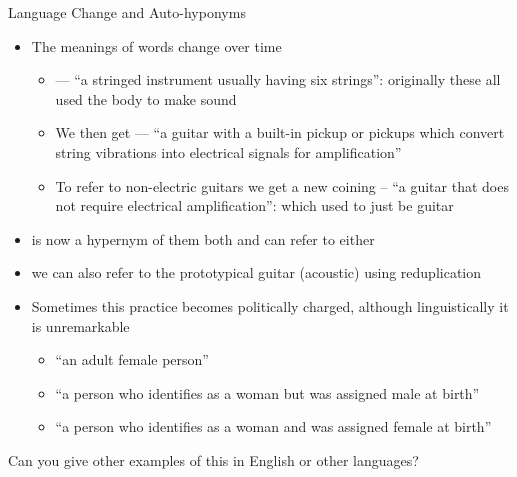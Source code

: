 \documentclass{beamer}
\begin{document}
\begin{frame}[allowframebreaks]{Language Change and Auto-hyponyms}

\begin{itemize}%
\item The meanings of words change over time
  \begin{itemize}
  \item {} --- ``a stringed instrument usually having six
    strings'': originally these all used the body to make sound
    
\item We then get  --- ``a guitar with a built-in
  pickup or pickups which convert string vibrations into electrical
  signals for amplification''
\item To refer to non-electric guitars we get a new coining
   -- ``a guitar that does not require electrical
  amplification'': which used to just be guitar
\end{itemize}
  \item {} is now a hypernym of them both and can refer to
    either
 \item we can also refer to the prototypical guitar (acoustic) using
   reduplication
   \\   

\framebreak
  
\item Sometimes this practice becomes politically charged, although
  linguistically it is unremarkable
  \begin{itemize}
  \item {} ``an adult female person''
  \item {} ``a person who identifies as a woman but was assigned male at birth''
  \item {}  ``a person who identifies as a woman and was assigned female at birth''
  \end{itemize}
  \end{itemize}
  \begin{taskb}
    Can you give other examples of this in English or other languages?
  \end{taskb}


% 
\end{frame}
\end{document}
